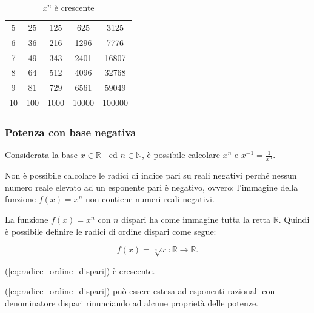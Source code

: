 \begin{landscape}
\begin{table}
\begin{tabular}{|c|c|c|c|c|}
        5	& 25	& 125	& 625	& 3125\\
        6	& 36	& 216	& 1296	& 7776\\
        7	& 49	& 343	& 2401	& 16807\\
        8	& 64	& 512	& 4096	& 32768\\
        9	& 81	& 729	& 6561	& 59049\\
        10	& 100	& 1000	& 10000	& 100000\\
    \hline
    \end{tabular}
    \caption{$x^n$ è crescente}\label{tab:x^n}
\end{table}
\end{landscape}

\subsubsection{Potenza con base negativa}
Considerata la base $x\in\mathbb R^-$ ed $n\in\mathbb N$, è possibile calcolare $x^n$ e $x^{-1}=\frac{1}{x^n}$.

\begin{remark}
    Non è possibile calcolare le radici di indice pari su reali negativi perché nessun numero reale elevato ad un esponente pari è negativo, ovvero: l'immagine della funzione $f(x)=x^n$ non contiene numeri reali negativi.
\end{remark}

La funzione $f(x)=x^n$ con $n$ dispari ha come immagine tutta la retta $\mathbb R$. Quindi è possibile definire le radici di ordine dispari come segue:
\begin{definition}
    \begin{equation}\label{eq:radice_ordine_dispari}
    f(x)=\sqrt[n]{x}\colon \mathbb R\rightarrow\mathbb R.
\end{equation}
\end{definition}

\begin{property}
    (\ref{eq:radice_ordine_dispari}) è crescente.
\end{property}

(\ref{eq:radice_ordine_dispari}) può essere estesa ad esponenti razionali con denominatore dispari rinunciando ad alcune proprietà delle potenze.

